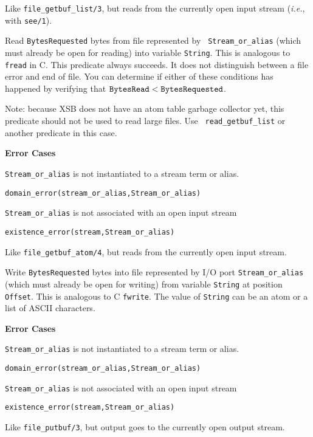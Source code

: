 \begin{description}

Like \verb|file_getbuf_list/3|, but reads from the currently open input stream
({\it i.e.}, with {\tt see/1}).


Read {\tt BytesRequested} bytes from file represented by {\tt
Stream\_or\_alias} (which must already be open for reading) into
variable {\tt String}. This is analogous to {\tt fread} in C.  This
predicate always succeeds. It does not distinguish between a file
error and end of file.  You can determine if either of these
conditions has happened by verifying that $\tt BytesRead <
BytesRequested$.

Note: because XSB does not have an atom table garbage collector yet,
this predicate should not be used to read large files.  Use {\tt
read\_getbuf\_list} or another predicate in this case.

{\bf Error Cases} 
\bi
\item 	{\tt Stream\_or\_alias} is not instantiated to a stream term
or alias.
\bi
\item 	{\tt domain\_error(stream\_or\_alias,Stream\_or\_alias)}
\ei
\item 	{\tt Stream\_or\_alias} is not associated with an open input stream
\bi
\item 	{\tt existence\_error(stream,Stream\_or\_alias)}
\ei
\ei

Like \verb|file_getbuf_atom/4|, but reads from the currently open input stream.

Write {\tt BytesRequested} bytes into file represented by I/O port
{\tt Stream\_or\_alias} (which must already be open for writing) from
variable {\tt String} at position {\tt Offset}. This is analogous to C
{\tt fwrite}.  The value of {\tt String} can be an atom or a list of
ASCII characters.

{\bf Error Cases} 
\bi
\item 	{\tt Stream\_or\_alias} is not instantiated to a stream term
or alias.
\bi
\item 	{\tt domain\_error(stream\_or\_alias,Stream\_or\_alias)}
\ei
\item 	{\tt Stream\_or\_alias} is not associated with an open input stream
\bi
\item 	{\tt existence\_error(stream,Stream\_or\_alias)}
\ei
\ei

Like \verb|file_putbuf/3|, but output goes to the currently open output stream.


\end{description}

